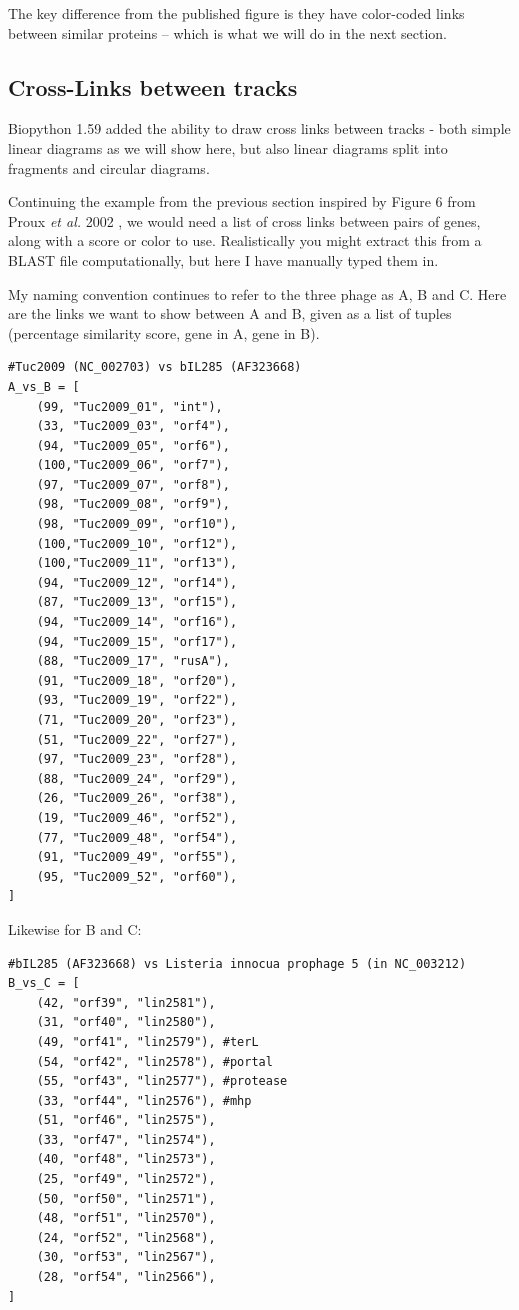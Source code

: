 \documentclass{report}
\begin{document}
The key difference from the published figure is they have color-coded links
between similar proteins -- which is what we will do in the next section.

\subsection{Cross-Links between tracks}
\label{sec:gd_cross_links}

Biopython 1.59 added the ability to draw cross links between tracks - both
simple linear diagrams as we will show here, but also linear diagrams split
into fragments and circular diagrams.

Continuing the example from the previous section inspired by Figure 6 from
Proux \textit{et al.} 2002 \cite{proux2002},
we would need a list of cross links between pairs of genes, along with a score
or color to use. Realistically you might extract this from a BLAST file
computationally, but here I have manually typed them in.

My naming convention continues to refer to the three phage as A, B and C.
Here are the links we want to show between A and B, given as a list of
tuples (percentage similarity score, gene in A, gene in B).

\begin{verbatim}
#Tuc2009 (NC_002703) vs bIL285 (AF323668)
A_vs_B = [
    (99, "Tuc2009_01", "int"),
    (33, "Tuc2009_03", "orf4"),
    (94, "Tuc2009_05", "orf6"),
    (100,"Tuc2009_06", "orf7"),
    (97, "Tuc2009_07", "orf8"),
    (98, "Tuc2009_08", "orf9"),
    (98, "Tuc2009_09", "orf10"),
    (100,"Tuc2009_10", "orf12"),
    (100,"Tuc2009_11", "orf13"),
    (94, "Tuc2009_12", "orf14"),
    (87, "Tuc2009_13", "orf15"),
    (94, "Tuc2009_14", "orf16"),
    (94, "Tuc2009_15", "orf17"),
    (88, "Tuc2009_17", "rusA"),
    (91, "Tuc2009_18", "orf20"),
    (93, "Tuc2009_19", "orf22"),
    (71, "Tuc2009_20", "orf23"),
    (51, "Tuc2009_22", "orf27"),
    (97, "Tuc2009_23", "orf28"),
    (88, "Tuc2009_24", "orf29"),
    (26, "Tuc2009_26", "orf38"),
    (19, "Tuc2009_46", "orf52"),
    (77, "Tuc2009_48", "orf54"),
    (91, "Tuc2009_49", "orf55"),
    (95, "Tuc2009_52", "orf60"), 
]
\end{verbatim}

Likewise for B and C:

\begin{verbatim}
#bIL285 (AF323668) vs Listeria innocua prophage 5 (in NC_003212)
B_vs_C = [
    (42, "orf39", "lin2581"),
    (31, "orf40", "lin2580"),
    (49, "orf41", "lin2579"), #terL
    (54, "orf42", "lin2578"), #portal
    (55, "orf43", "lin2577"), #protease
    (33, "orf44", "lin2576"), #mhp
    (51, "orf46", "lin2575"),
    (33, "orf47", "lin2574"),
    (40, "orf48", "lin2573"),
    (25, "orf49", "lin2572"),
    (50, "orf50", "lin2571"),
    (48, "orf51", "lin2570"),
    (24, "orf52", "lin2568"),
    (30, "orf53", "lin2567"),
    (28, "orf54", "lin2566"),
]
\end{verbatim}
\end{document}

